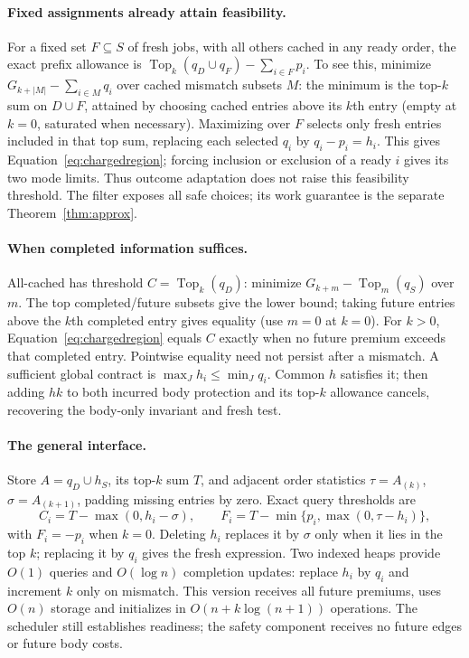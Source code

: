 \documentclass[acmsmall,screen,review,anonymous]{acmart}
\begin{document}
\paragraph{Fixed assignments already attain feasibility.}
For a fixed set $F\subseteq S$ of fresh jobs, with all others cached in any ready order, the exact prefix allowance is $\operatorname{Top}_k(q_D\cup q_F)-\sum_{i\in F}p_i$. To see this, minimize $G_{k+|M|}-\sum_{i\in M}q_i$ over cached mismatch subsets $M$: the minimum is the top-$k$ sum on $D\cup F$, attained by choosing cached entries above its $k$th entry (empty at $k=0$, saturated when necessary). Maximizing over $F$ selects only fresh entries included in that top sum, replacing each selected $q_i$ by $q_i-p_i=h_i$. This gives Equation~\eqref{eq:chargedregion}; forcing inclusion or exclusion of a ready $i$ gives its two mode limits. Thus outcome adaptation does not raise this feasibility threshold. The filter exposes all safe choices; its work guarantee is the separate Theorem~\ref{thm:approx}.

\paragraph{When completed information suffices.}
All-cached has threshold $C=\operatorname{Top}_k(q_D)$: minimize $G_{k+m}-\operatorname{Top}_m(q_S)$ over $m$. The top completed/future subsets give the lower bound; taking future entries above the $k$th completed entry gives equality (use $m=0$ at $k=0$). For $k>0$, Equation~\eqref{eq:chargedregion} equals $C$ exactly when no future premium exceeds that completed entry. Pointwise equality need not persist after a mismatch. A sufficient global contract is $\max_Jh_i\le\min_Jq_i$. Common $h$ satisfies it; then adding $hk$ to both incurred body protection and its top-$k$ allowance cancels, recovering the body-only invariant and fresh test.

\paragraph{The general interface.}
Store $A=q_D\cup h_S$, its top-$k$ sum $T$, and adjacent order statistics $\tau=A_{(k)}$, $\sigma=A_{(k+1)}$, padding missing entries by zero. Exact query thresholds are
\[
 C_i=T-\max(0,h_i-\sigma),\qquad
 F_i=T-\min\{p_i,\max(0,\tau-h_i)\},
\]
with $F_i=-p_i$ when $k=0$. Deleting $h_i$ replaces it by $\sigma$ only when it lies in the top $k$; replacing it by $q_i$ gives the fresh expression. Two indexed heaps provide $O(1)$ queries and $O(\log n)$ completion updates: replace $h_i$ by $q_i$ and increment $k$ only on mismatch. This version receives all future premiums, uses $O(n)$ storage and initializes in $O(n+k\log(n+1))$ operations. The scheduler still establishes readiness; the safety component receives no future edges or future body costs.
\end{document}
